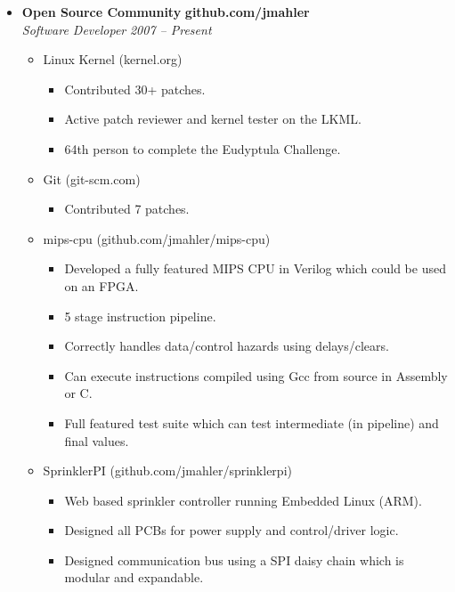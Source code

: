 \begin{itemize}
    \item
    \headerrow
        {\textbf{Open Source Community}}
        {\textbf{github.com/jmahler}}
    \\
    \headerrow
        {\emph{Software Developer}}
        {\emph{2007 -- Present}}
    \begin{itemize}
        \item Linux Kernel (kernel.org)
            \begin{itemize}
            \item Contributed 30+ patches.
            \item Active patch reviewer and kernel tester on the LKML.
            \item 64th person to complete the Eudyptula Challenge.
            \end{itemize}
        \item Git (git-scm.com)
            \begin{itemize}
            \item Contributed 7 patches.
            \end{itemize}
        \item mips-cpu (github.com/jmahler/mips-cpu)
            \begin{itemize}
            \item Developed a fully featured MIPS CPU in Verilog which
                could be used on an FPGA.
            \item 5 stage instruction pipeline.
            \item Correctly handles data/control hazards using
                    delays/clears.
            \item Can execute instructions compiled using Gcc from
                source in Assembly or C.
            \item Full featured test suite which can test intermediate
                (in pipeline) and final values.
            \end{itemize}
        \item SprinklerPI (github.com/jmahler/sprinklerpi)
            \begin{itemize}
            \item Web based sprinkler controller running Embedded Linux (ARM).
            \item Designed all PCBs for power supply and control/driver logic.
            \item Designed communication bus using a SPI daisy chain which
                is modular and expandable.
            \end{itemize}
    \end{itemize}
\end{itemize}
